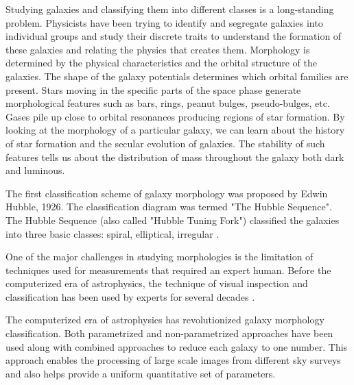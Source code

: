 \documentclass[fleqn,usenatbib]{mnras}
\begin{document}
\hspace{0.25 in}Studying galaxies and classifying them into different classes is a long-standing problem. Physicists have been trying to identify and segregate galaxies into individual groups and study their discrete traits to understand the formation of these galaxies and relating the physics that creates them. Morphology is determined by the physical characteristics and the orbital structure of the galaxies. The shape of the galaxy potentials determines which orbital families are present. Stars moving in the specific parts of the space phase generate morphological features such as bars, rings, peanut bulges, pseudo-bulges, etc. Gases pile up close to orbital resonances producing regions of star formation. By looking at the morphology of a particular galaxy, we can learn about the history of star formation and the secular evolution of galaxies. The stability of such features tells us about the distribution of mass throughout the galaxy both dark and luminous.

The first classification scheme of galaxy morphology was proposed by Edwin Hubble, 1926. The classification diagram was termed "The Hubble Sequence". The Hubble Sequence (also called "Hubble Tuning Fork") classified the galaxies into three basic classes: spiral, elliptical, irregular \citep{hubble1926extragalactic}.

One of the major challenges in studying morphologies is the limitation of techniques used for measurements that required an expert human. Before the computerized era of astrophysics, the technique of visual inspection and classification has been used by experts for several decades \citep{hubble1926extragalactic, 1959HDP....53..275D,Edmondson464,1976ApJ...206..883V}.

The computerized era of astrophysics has revolutionized galaxy morphology classification. Both parametrized \citep{1968adga.book.....S, Cohen_2003} and non-parametrized approaches have been used along with combined approaches \citep{2003ApJS..147....1C,2004AJ....128..163L} to reduce each galaxy to one number. This approach enables the processing of large scale images from different sky surveys \citep{Djorgovski_2013} and also helps provide a uniform quantitative set of parameters.
\end{document}

